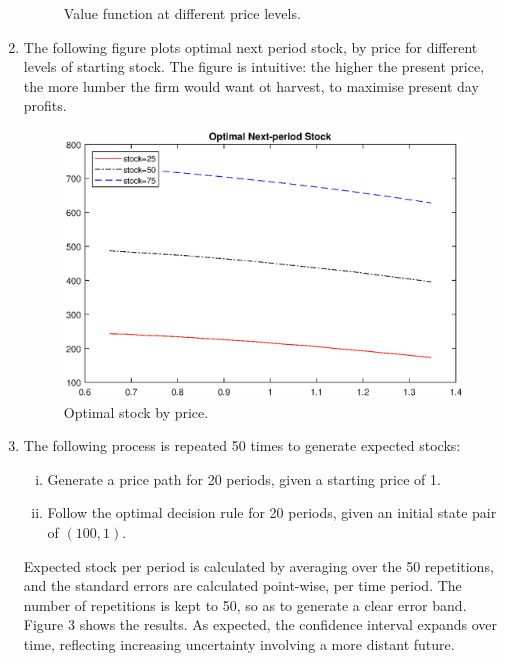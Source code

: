 \documentclass[12pt,a4paper]{article}
\begin{document}
\begin{enumerate}[1.]
\begin{figure}[h]
\begin{center}
\end{center}
\caption{Value function at different price levels.}
\end{figure}
\item The following figure plots optimal next period stock, by price for different levels of starting stock. The figure is intuitive: the higher the present price, the more lumber the firm would want ot harvest, to maximise present day profits. 
\begin{figure}[h]
\includegraphics[width=\textwidth]{stock.eps}\vspace{-3ex}
\caption{Optimal stock by price.}
\end{figure}
\item The following process is repeated 50 times to generate expected stocks:
\begin{enumerate}[(i)]
\item Generate a price path for 20 periods, given a starting price of 1.
\item Follow the optimal decision rule for 20 periods, given an initial state pair of $(100,1)$.
\end{enumerate}
Expected stock per period is calculated by averaging over the 50 repetitions, and the standard errors are calculated point-wise, per time period. The number of repetitions is kept to 50, so as to generate a clear error band. Figure 3 shows the results. As expected, the confidence interval expands over time, reflecting increasing uncertainty involving a more distant future.
\begin{figure}[h]

\end{figure}
\end{enumerate}
\end{document}
